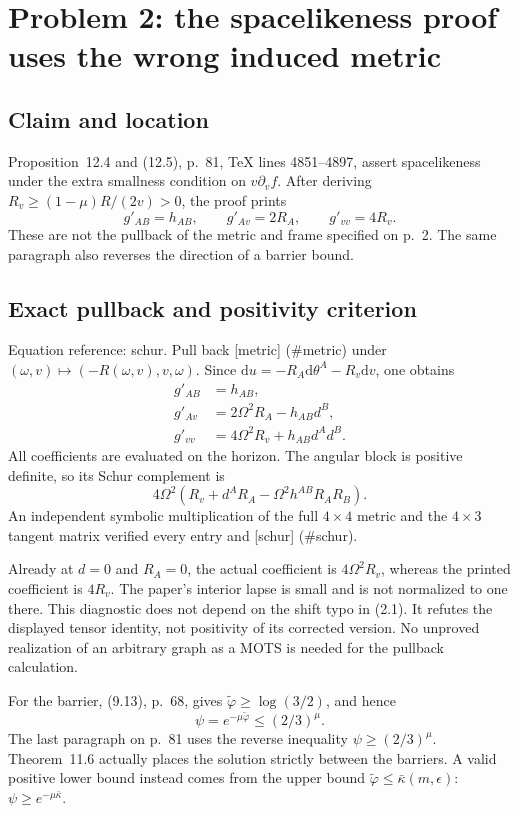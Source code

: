 \documentclass[10pt]{article}
\begin{document}
\section*{Problem 2: the spacelikeness proof uses the wrong induced metric}
\subsection*{Claim and location}
Proposition 12.4 and (12.5), p. 81, TeX lines 4851–4897, assert spacelikeness under the extra smallness condition on \(v\partial_v f\). After deriving \(R_v\ge (1-\mu)R/(2v)>0\), the proof prints \[g'_{AB}=h_{AB},\qquad g'_{Av}=2R_A,\qquad g'_{vv}=4R_v.\] These are not the pullback of the metric and frame specified on p. 2. The same paragraph also reverses the direction of a barrier bound.\par
\subsection*{Exact pullback and positivity criterion}
Equation reference: schur. Pull back [metric] (\#metric) under \((\omega,v)\mapsto(-R(\omega,v),v,\omega)\). Since \(\mathrm du=-R_A\mathrm d\theta^A-R_v\mathrm dv\), one obtains \[\begin{aligned}
 g'_{AB}&=h_{AB},\\
 g'_{Av}&=2\Omega^2 R_A-h_{AB}d^B,\\
 g'_{vv}&=4\Omega^2R_v+h_{AB}d^Ad^B.\end{aligned}\] All coefficients are evaluated on the horizon. The angular block is positive definite, so its Schur complement is \[
 4\Omega^2\left(
 R_v+d^AR_A-\Omega^2 h^{AB}R_AR_B\right).\] An independent symbolic multiplication of the full \(4\times4\) metric and the \(4\times3\) tangent matrix verified every entry and [schur] (\#schur).\par
Already at \(d=0\) and \(R_A=0\), the actual coefficient is \(4\Omega^2R_v\), whereas the printed coefficient is \(4R_v\). The paper’s interior lapse is small and is not normalized to one there. This diagnostic does not depend on the shift typo in (2.1). It refutes the displayed tensor identity, not positivity of its corrected version. No unproved realization of an arbitrary graph as a MOTS is needed for the pullback calculation.\par
For the barrier, (9.13), p. 68, gives \(\widetilde\varphi\ge\log(3/2)\), and hence \[\psi=e^{-\mu\widetilde\varphi}\le(2/3)^\mu.\] The last paragraph on p. 81 uses the reverse inequality \(\psi\ge(2/3)^\mu\). Theorem 11.6 actually places the solution strictly between the barriers. A valid positive lower bound instead comes from the upper bound \(\widetilde\varphi\le\bar\kappa(m,\epsilon)\): \(\psi\ge e^{-\mu\bar\kappa}\).\par
\end{document}
